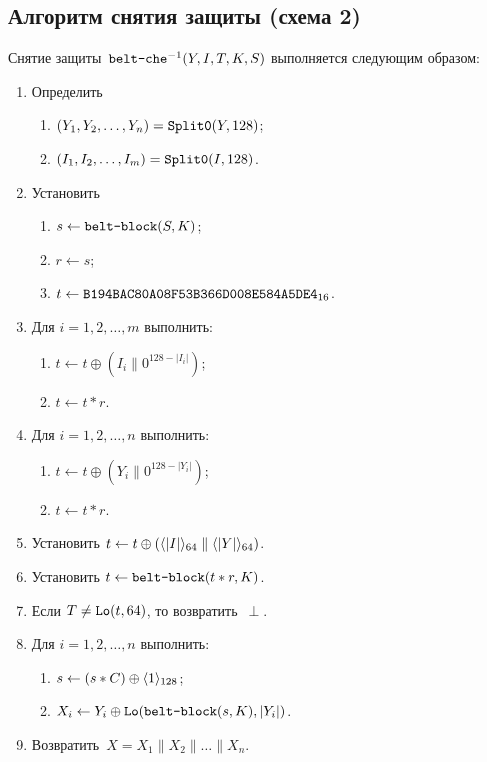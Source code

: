 \subsection{Алгоритм снятия защиты (схема 2)}\label{AE.CHE.Unwrap}

Снятие защиты~$\texttt{belt-che}^{-1}(Y,I,T,K,S)$ выполняется следующим образом:
\begin{enumerate}
\item
Определить 
\begin{enumerate}
\item
$(Y_1,Y_2,\ldots,Y_n)=\mathop{\texttt{Split0}}\nolimits(Y, 128)$;
\item
$(I_1,I_2,\ldots,I_m)=\mathop{\texttt{Split0}}\nolimits(I, 128)$. 
\end{enumerate}
\item
Установить
\begin{enumerate}
\item
$s\leftarrow\texttt{belt-block}(S,K)$;
\item
$r\leftarrow s$;
\item
$t\leftarrow\texttt{B194BAC80A08F53B366D008E584A5DE4}_{16}$.
\end{enumerate}

\item
Для $i=1,2,\ldots,m$ выполнить:
\begin{enumerate}
\item
$t\leftarrow t\oplus (I_i\parallel 0^{128-|I_i|})$;
\item
$t\leftarrow t\ast r$.
\end{enumerate}

\item\label{Step.AE.CHE.StepA}
Для $i=1,2,\ldots,n$ выполнить:
\begin{enumerate}
\item
$t\leftarrow t\oplus (Y_i\parallel 0^{128-|Y_i|})$;
\item
$t\leftarrow t\ast r$.
\end{enumerate}

\item
Установить
$t\leftarrow t\oplus (\langle|I|\rangle_{64}\parallel\langle|Y|\rangle_{64})$.

\item
Установить
$t\leftarrow\texttt{belt-block}(t\ast r,K)$.

\item\label{Step.AE.CHE.VerifyMAC}
Если $T\neq\mathop{\texttt{Lo}}\nolimits(t, 64)$, то возвратить~$\perp$.

\item\label{Step.AE.CHE.StepD}
Для $i=1,2,\ldots,n$ выполнить:
\begin{enumerate}
\item
$s\leftarrow (s\ast C)\oplus\langle1\rangle_{128}$;
\item
$X_i\leftarrow Y_i\oplus \mathop{\texttt{Lo}}\nolimits(\texttt{belt-block}(s,K), |Y_i|)$.
\end{enumerate}
\item
Возвратить~$X=X_1\parallel X_2\parallel\ldots\parallel X_n$.
\end{enumerate}

